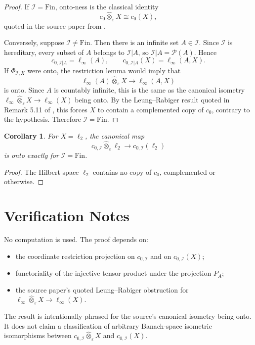\documentclass[11pt]{article}
\newtheorem{corollary}{Corollary}
\newcommand{\Fin}{\mathrm{Fin}}
\newcommand{\I}{\mathcal I}
\newcommand{\eps}{\varepsilon}
\begin{document}
\begin{proof}
If \(\I=\Fin\), onto-ness is the classical identity
\[
  c_0\hat\otimes_\eps X \cong c_0(X),
\]
quoted in the source paper from \cite[Theorem 1.1.11]{diestel}.

Conversely, suppose \(\I\ne\Fin\).  Then there is an infinite set \(A\in\I\).
Since \(\I\) is hereditary, every subset of \(A\) belongs to \(\I|A\), so
\(\I|A=\mathcal P(A)\).  Hence
\[
  c_{0,\I|A}=\ell_\infty(A),\qquad
  c_{0,\I|A}(X)=\ell_\infty(A,X).
\]
If \(\Phi_{\I,X}\) were onto, the restriction lemma would imply that
\[
  \ell_\infty(A)\hat\otimes_\eps X\to \ell_\infty(A,X)
\]
is onto.  Since \(A\) is countably infinite, this is the same as the canonical
isometry \(\ell_\infty\hat\otimes_\eps X\to \ell_\infty(X)\) being onto.
By the Leung--Rabiger result quoted in Remark 5.11 of \cite{rvu2023}, this
forces \(X\) to contain a complemented copy of \(c_0\), contrary to the
hypothesis.  Therefore \(\I=\Fin\).
\end{proof}

\begin{corollary}
For \(X=\ell_2\), the canonical map
\[
  c_{0,\I}\hat\otimes_\eps \ell_2\to c_{0,\I}(\ell_2)
\]
is onto exactly for \(\I=\Fin\).
\end{corollary}

\begin{proof}
The Hilbert space \(\ell_2\) contains no copy of \(c_0\), complemented or
otherwise.
\end{proof}

\section*{Verification Notes}

No computation is used.  The proof depends on:
\begin{itemize}
\item the coordinate restriction projection on \(c_{0,\I}\) and on
\(c_{0,\I}(X)\);
\item functoriality of the injective tensor product under the projection
\(P_A\);
\item the source paper's quoted Leung--Rabiger obstruction for
\(\ell_\infty\hat\otimes_\eps X\to\ell_\infty(X)\).
\end{itemize}

The result is intentionally phrased for the source's canonical isometry being
onto.  It does not claim a classification of arbitrary Banach-space isometric
isomorphisms between \(c_{0,\I}\hat\otimes_\eps X\) and \(c_{0,\I}(X)\).
\end{document}

